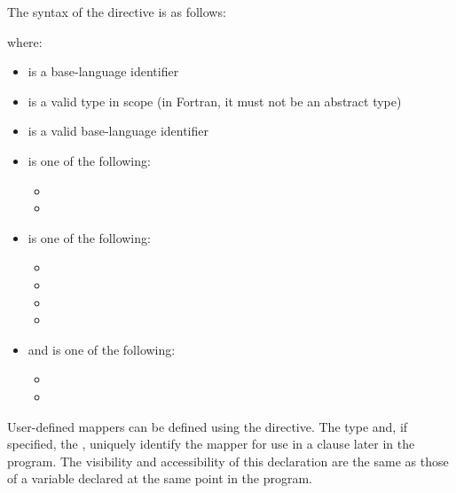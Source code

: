 \begin{fortranspecific}
The syntax of the  directive is as follows:


\end{fortranspecific}

where:

\begin{itemize}
  \item {} is a base-language identifier
  \item {} is a valid type in scope (in Fortran, it must not be an abstract type)
  \item {} is a valid base-language identifier
  \item {} is one of the following:
    \begin{itemize}
      \item {}
      \item {}
    \end{itemize}
  \item {} is one of the following:
    \begin{itemize}
      \item {}
      \item {}
      \item {}
      \item {}
    \end{itemize}
  \item and  is one of the following:
    \begin{itemize}
      \item {}
      \item {}
    \end{itemize}
\end{itemize}

\descr


User-defined mappers can be defined using the  directive.
The type and, if specified, the , uniquely identify the
mapper for use in a  clause later in the program.  The visibility and
accessibility of this declaration are the same as those of a variable declared
at the same point in the program.

